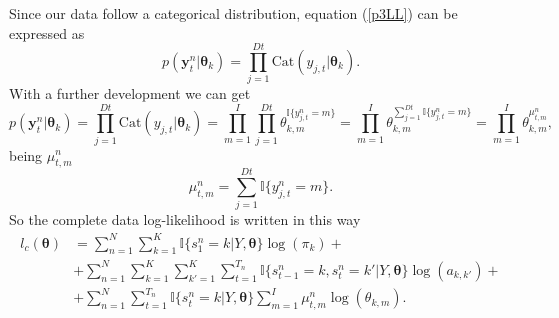\documentclass[12pt]{article}%
\newcommand{\indicator}{\mathbb{I}}
\begin{document}
\noindent Since our data follow a categorical distribution, equation (\ref{p3LL}) can be expressed as
\begin{equation}
p \left( \mathbf { y } _ { t } ^ { n } | \boldsymbol\theta_{k} \right) = \prod\limits_{j=1}^{Dt} \text{Cat}(y_{j,t}|\boldsymbol\theta_{k}).
\end{equation}
With a further development we can get
\begin{equation}
p \left( \mathbf { y } _ { t } ^ { n } | \boldsymbol\theta_{k} \right) = \prod\limits_{j=1}^{Dt} \text{Cat}(y_{j,t}|\boldsymbol\theta_{k}) = \prod\limits_{m=1}^{I}\prod\limits_{j=1}^{Dt}\theta_{k,m}^{\indicator\lbrace{y_{j,t}^{n}=m}\rbrace} = \prod\limits_{m=1}^{I}\theta_{k,m}^{\sum\limits_{j=1}^{Dt}\indicator\lbrace{y_{j,t}^{n}=m}\rbrace} = \prod\limits_{m=1}^{I}\theta_{k,m}^{\mu^{n}_{t,m}},
\end{equation}
being $\mu^{n}_{t,m}$
\begin{equation}
\mu^{n}_{t,m} = \sum\limits_{j=1}^{Dt}\indicator\lbrace{y_{j,t}^{n}=m}\rbrace.
\end{equation}
So the complete data log-likelihood is written in this way
\begin{equation}
\begin{split}
l_{c}\left(\boldsymbol\theta\right) &= \sum\limits_{n=1}^{N}\sum\limits_{k=1}^{K}\indicator \lbrace s_{1}^{n}=k|Y,\boldsymbol\theta\rbrace \log(\pi_{k}) + \\
&+ \sum\limits_{n=1}^{N}\sum\limits_{k=1}^{K}\sum\limits_{k'=1}^{K}\sum\limits_{t=1}^{T_{n}}\indicator \lbrace s_{t-1}^{n}=k,s_{t}^{n}=k'|Y,\boldsymbol\theta\rbrace \log(a_{k,k'}) + \\
&+ \sum\limits_{n=1}^{N}\sum\limits_{t=1}^{T_{n}}  \indicator \lbrace s_{t}^{n}=k|Y,\boldsymbol\theta\rbrace    \sum\limits_{m=1}^{I}\mu^{n}_{t,m} \log(\theta_{k,m}).
\end{split}
\end{equation}
\end{document}
